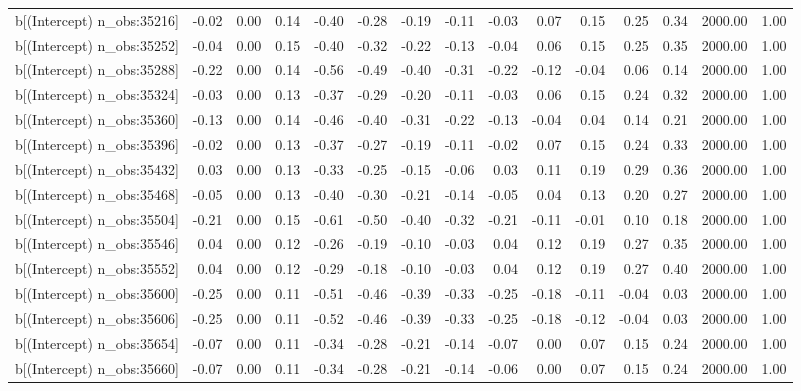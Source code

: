 \begin{table}[ht]
\begin{tabular}{rrrrrrrrrrrrrrr}
  b[(Intercept) n\_obs:35216] & -0.02 & 0.00 & 0.14 & -0.40 & -0.28 & -0.19 & -0.11 & -0.03 & 0.07 & 0.15 & 0.25 & 0.34 & 2000.00 & 1.00 \\ 
  b[(Intercept) n\_obs:35252] & -0.04 & 0.00 & 0.15 & -0.40 & -0.32 & -0.22 & -0.13 & -0.04 & 0.06 & 0.15 & 0.25 & 0.35 & 2000.00 & 1.00 \\ 
  b[(Intercept) n\_obs:35288] & -0.22 & 0.00 & 0.14 & -0.56 & -0.49 & -0.40 & -0.31 & -0.22 & -0.12 & -0.04 & 0.06 & 0.14 & 2000.00 & 1.00 \\ 
  b[(Intercept) n\_obs:35324] & -0.03 & 0.00 & 0.13 & -0.37 & -0.29 & -0.20 & -0.11 & -0.03 & 0.06 & 0.15 & 0.24 & 0.32 & 2000.00 & 1.00 \\ 
  b[(Intercept) n\_obs:35360] & -0.13 & 0.00 & 0.14 & -0.46 & -0.40 & -0.31 & -0.22 & -0.13 & -0.04 & 0.04 & 0.14 & 0.21 & 2000.00 & 1.00 \\ 
  b[(Intercept) n\_obs:35396] & -0.02 & 0.00 & 0.13 & -0.37 & -0.27 & -0.19 & -0.11 & -0.02 & 0.07 & 0.15 & 0.24 & 0.33 & 2000.00 & 1.00 \\ 
  b[(Intercept) n\_obs:35432] & 0.03 & 0.00 & 0.13 & -0.33 & -0.25 & -0.15 & -0.06 & 0.03 & 0.11 & 0.19 & 0.29 & 0.36 & 2000.00 & 1.00 \\ 
  b[(Intercept) n\_obs:35468] & -0.05 & 0.00 & 0.13 & -0.40 & -0.30 & -0.21 & -0.14 & -0.05 & 0.04 & 0.13 & 0.20 & 0.27 & 2000.00 & 1.00 \\ 
  b[(Intercept) n\_obs:35504] & -0.21 & 0.00 & 0.15 & -0.61 & -0.50 & -0.40 & -0.32 & -0.21 & -0.11 & -0.01 & 0.10 & 0.18 & 2000.00 & 1.00 \\ 
  b[(Intercept) n\_obs:35546] & 0.04 & 0.00 & 0.12 & -0.26 & -0.19 & -0.10 & -0.03 & 0.04 & 0.12 & 0.19 & 0.27 & 0.35 & 2000.00 & 1.00 \\ 
  b[(Intercept) n\_obs:35552] & 0.04 & 0.00 & 0.12 & -0.29 & -0.18 & -0.10 & -0.03 & 0.04 & 0.12 & 0.19 & 0.27 & 0.40 & 2000.00 & 1.00 \\ 
  b[(Intercept) n\_obs:35600] & -0.25 & 0.00 & 0.11 & -0.51 & -0.46 & -0.39 & -0.33 & -0.25 & -0.18 & -0.11 & -0.04 & 0.03 & 2000.00 & 1.00 \\ 
  b[(Intercept) n\_obs:35606] & -0.25 & 0.00 & 0.11 & -0.52 & -0.46 & -0.39 & -0.33 & -0.25 & -0.18 & -0.12 & -0.04 & 0.03 & 2000.00 & 1.00 \\ 
  b[(Intercept) n\_obs:35654] & -0.07 & 0.00 & 0.11 & -0.34 & -0.28 & -0.21 & -0.14 & -0.07 & 0.00 & 0.07 & 0.15 & 0.24 & 2000.00 & 1.00 \\ 
  b[(Intercept) n\_obs:35660] & -0.07 & 0.00 & 0.11 & -0.34 & -0.28 & -0.21 & -0.14 & -0.06 & 0.00 & 0.07 & 0.15 & 0.24 & 2000.00 & 1.00 \\ 

\end{tabular}
\end{table}
